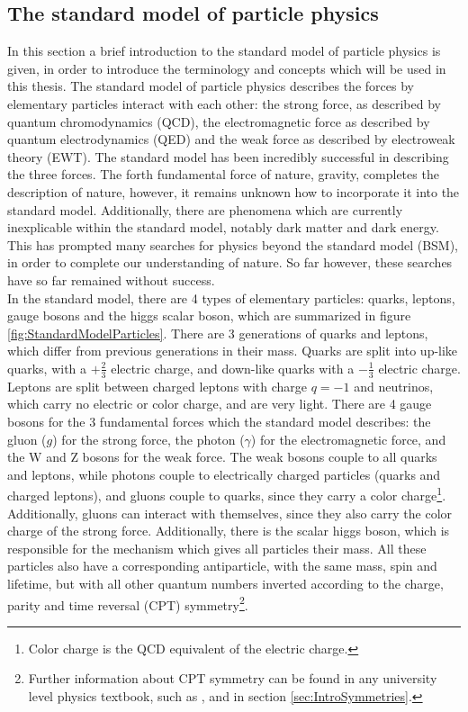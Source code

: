 \subsection{The standard model of particle physics}
In this section a brief introduction to the standard model of particle physics is given, in order to introduce the terminology and concepts which will be used in this thesis. 
The standard model of particle physics describes the forces by elementary particles interact with each other: the strong force, as described by quantum chromodynamics (QCD), the electromagnetic force as described by quantum electrodynamics (QED) and the weak force as described by electroweak theory (EWT). The standard model has been incredibly successful in describing the three forces. The forth fundamental force of nature, gravity, completes the description of nature, however, it remains unknown how to incorporate it into the standard model. Additionally, there are phenomena which are currently inexplicable within the standard model, notably dark matter and dark energy. This has prompted many searches for physics beyond the standard model (BSM), in order to complete our understanding of nature. So far however, these searches have so far remained without success. \\

In the standard model, there are 4 types of elementary particles: quarks, leptons, gauge bosons and the higgs scalar boson, which are summarized in figure \ref{fig:StandardModelParticles}. There are 3 generations of quarks and leptons, which differ from previous generations in their mass. Quarks are split into up-like quarks, with a $+\frac{2}{3}$ electric charge, and down-like quarks with a $-\frac{1}{3}$ electric charge. Leptons are split between charged leptons with charge $q=-1$ and neutrinos, which carry no electric or color charge, and are very light. There are 4 gauge bosons for the 3 fundamental forces which the standard model describes: the gluon ($g$) for the strong force, the photon ($\gamma$) for the electromagnetic force, and the W and Z bosons for the weak force. The weak bosons couple to all quarks and leptons, while photons couple to electrically charged particles (quarks and charged leptons), and gluons couple to quarks, since they carry a color charge\footnote{Color charge is the QCD equivalent of the electric charge.}. Additionally, gluons can interact with themselves, since they also carry the color charge of the strong force.
Additionally, there is the scalar higgs boson, which is responsible for the mechanism which gives all particles their mass.
All these particles also have a corresponding antiparticle, with the same mass, spin and lifetime, but with all other quantum numbers inverted according to the charge, parity and time reversal (CPT) symmetry\footnote{Further information about CPT symmetry can be found in any university level physics textbook, such as \cite{}, and in section \ref{sec:IntroSymmetries}.}. \\

